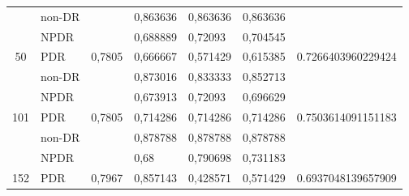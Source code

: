 \begin{table}[hbtp]
\begin{center}
\begin{tabular}{|c|l|c|l|l|l|c|}
			& non-DR                                             &                          & 0,863636                                          & 0,863636                                         & 0,863636                                        &                                      \\ \cline{2-2} \cline{4-6}
			& NPDR                                               &                          & 0,688889                                          & 0,72093                                          & 0,704545                                        &                                      \\ \cline{2-2} \cline{4-6}
			\multirow{-3}{*}{50}  & PDR                                                & \multirow{-3}{*}{0,7805} & 0,666667                                          & 0,571429                                         & 0,615385                                        & \multirow{-3}{*}{0.7266403960229424} \\ \hline
			& non-DR                                             &                          & 0,873016                                          & 0,833333                                         & 0,852713                                        &                                      \\ \cline{2-2} \cline{4-6}
			& NPDR                                               &                          & 0,673913                                          & 0,72093                                          & 0,696629                                        &                                      \\ \cline{2-2} \cline{4-6}
			\multirow{-3}{*}{101} & PDR                                                & \multirow{-3}{*}{0,7805} & 0,714286                                          & 0,714286                                         & 0,714286                                        & \multirow{-3}{*}{0.7503614091151183} \\ \hline
			& non-DR                                             &                          & 0,878788                                          & 0,878788                                         & 0,878788                                        &                                      \\ \cline{2-2} \cline{4-6}
			& NPDR                                               &                          & 0,68                                              & 0,790698                                         & 0,731183                                        &                                      \\ \cline{2-2} \cline{4-6}
			\multirow{-3}{*}{152} & PDR                                                & \multirow{-3}{*}{0,7967} & 0,857143                                          & 0,428571                                         & 0,571429                                        & \multirow{-3}{*}{0.6937048139657909} \\ \hline
		\end{tabular}
	\end{center}
\end{table}


